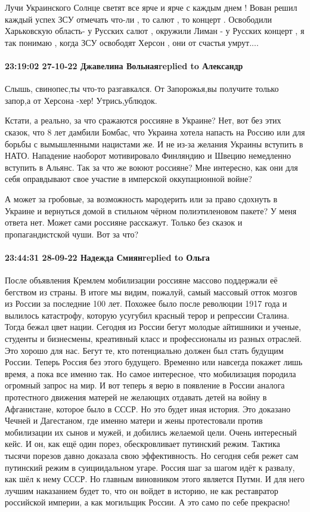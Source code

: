 Лучи Украинского  Солнце   светят все ярче и ярче с каждым днем ! Вован решил
каждый успех ЗСУ отмечать что-ли , то салют , то концерт . Освободили
Харьковскую область- у Русских  салют , окружили Лиман - у Русских  концерт , я
так понимаю ,  когда ЗСУ освободят Херсон , они от счастья умрут....

\paragraph{23:19:02 27-10-22 Джавелина Вольнаяreplied to Александр}

Слышь, свинопес,ты что-то разгавкался. От Запорожья,вы получите только запор,а
от Херсона -хер! Утрись,ублюдок.



Кстати, а реально, за что сражаются россияне в Украине? Нет, вот без этих
сказок, что 8 лет дамбили Бомбас, что Украина хотела напасть на Россию или для
борьбы с вымышленными нацистами же. И не из-за желания Украины вступить в НАТО.
Нападение наоборот мотивировало Финляндию и Швецию немедленно вступить в
Альянс. Так за что же воюют россияне? Мне интересно, как они для себя
оправдывают свое участие в имперской оккупационной войне?

А может за гробовые, за возможность мародерить или за право сдохнуть в Украине
и вернуться домой в стильном чёрном полиэтиленовом пакете? У меня ответа нет.
Может сами россияне расскажут. Только без сказок и пропагандистской чуши. Вот
за что?


\paragraph{23:44:31 28-09-22 Надежда Смиянreplied to Ольга}
После объявления Кремлем мобилизации россияне массово поддержали её бегством из страны. В итоге мы видим, пожалуй, самый массовый отток мозгов из России за последние 100 лет. Похожее было после революции 1917 года и вылилось катастрофу, которую усугубил красный терор и репрессии Сталина. Тогда бежал цвет нации.
Сегодня из России бегут молодые айтишники и ученые, студенты и бизнесмены, креативный класс и профессионалы из разных отраслей. Это хорошо для нас. Бегут те, кто потенциально должен был стать будущим России. Теперь Россия без этого будущего. Временно или навсегда покажет лишь время, а пока все именно так.
Но самое интересное, что мобилизация породила огромный запрос на мир. И вот теперь я верю в появление в России аналога протестного движения матерей не желающих отдавать детей на войну в Афганистане, которое было в СССР. Но это будет иная история. Это доказано Чечней и Дагестаном, где именно матери и жены протестовали против мобилизации их сынов и мужей, и добились желаемой цели. Очень интересный кейс. И он, как ещё один порез, обескровливает путинский режим. Тактика тысячи порезов давно доказала свою эффективность. Но сегодня себя режет сам путинский режим в суициидальном угаре.
Россия шаг за шагом идёт к развалу, как шёл к нему СССР. Но главным виновником этого является Путмн. И для него лучшим наказанием будет то, что он войдет в историю, не как реставратор российской империи, а как могильщик России. А это само по себе прекрасно!


